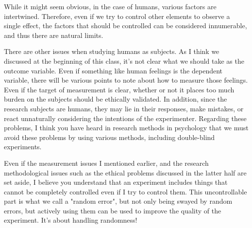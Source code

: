 \documentclass{ltjbook}
\begin{document}
While it might seem obvious, in the case of humans, various factors are intertwined. Therefore, even if we try to control other elements to observe a single effect, the factors that should be controlled can be considered innumerable, and thus there are natural limits.

There are other issues when studying humans as subjects. As I think we discussed at the beginning of this class, it's not clear what we should take as the outcome variable. Even if something like human feelings is the dependent variable, there will be various points to note about how to measure those feelings. Even if the target of measurement is clear, whether or not it places too much burden on the subjects should be ethically validated. In addition, since the research subjects are humans, they may lie in their responses, make mistakes, or react unnaturally considering the intentions of the experimenter. Regarding these problems, I think you have heard in research methods in psychology that we must avoid these problems by using various methods, including double-blind experiments.

Even if the measurement issues I mentioned earlier, and the research methodological issues such as the ethical problems discussed in the latter half are set aside, I believe you understand that an experiment includes things that cannot be completely controlled even if I try to control them. This uncontrollable part is what we call a "random error", but not only being swayed by random errors, but actively using them can be used to improve the quality of the experiment. It's about handling randomness!
\end{document}

